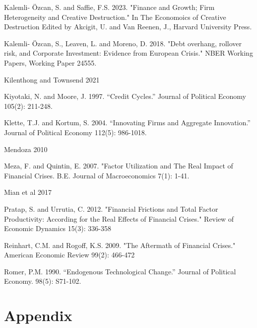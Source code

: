 \documentclass[a4paper,12pt]{article}
\begin{document}
\begin{thebibliography}{9}
    \item Kalemli- Özcan, S. and Saffie, F.S. 2023. "Finance and Growth; Firm Heterogeneity and Creative Destruction." In The Economoics of Creative Destruction Edited by Akcigit, U. and Van Reenen, J., Harvard University Press.
    \item Kalemli- Özcan, S., Leaven, L. and Moreno, D. 2018. "Debt overhang, rollover risk, and Corporate Investment: Evidence from European Crisis." NBER Working Papers, Working Paper 24555.
    \item Kilenthong and Townsend 2021
    \item Kiyotaki, N. and Moore, J. 1997. “Credit Cycles.” Journal of Political Economy 105(2): 211-248.
    \item Klette, T.J. and Kortum, S. 2004. “Innovating Firms and Aggregate Innovation.” Journal of Political Economy 112(5): 986-1018.
    \item Mendoza 2010
    \item Meza, F. and Quintin, E. 2007. "Factor Utilization and The Real Impact of Financial Crises. B.E. Journal of Macroeconomics 7(1): 1-41.
    \item Mian et al 2017
    \item Pratap, S. and Urrutia, C. 2012. "Financial Frictions and Total Factor Productivity: According for the Real Effects of Financial Crises." Review of Economic Dynamics 15(3): 336-358
    \item Reinhart, C.M. and Rogoff, K.S. 2009. "The Aftermath of Financial Crises." American Economic Review 99(2): 466-472
    \item Romer, P.M. 1990. “Endogenous Technological Change.” Journal of Political Economy. 98(5): S71-102.
\end{thebibliography}

\clearpage
\section*{Appendix}
\end{document}
